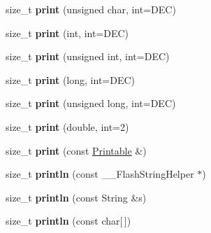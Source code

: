 \begin{DoxyCompactItemize}
\item 
\hypertarget{class_print_a97bd44df9222fa4a51a1266fab8d3bc1}{}size\+\_\+t {\bfseries print} (unsigned char, int=D\+E\+C)\label{class_print_a97bd44df9222fa4a51a1266fab8d3bc1}

\item 
\hypertarget{class_print_a32cb3cf32d701c797b2b2d1080052dfe}{}size\+\_\+t {\bfseries print} (int, int=D\+E\+C)\label{class_print_a32cb3cf32d701c797b2b2d1080052dfe}

\item 
\hypertarget{class_print_a87275de35583868a370f43ce1c887750}{}size\+\_\+t {\bfseries print} (unsigned int, int=D\+E\+C)\label{class_print_a87275de35583868a370f43ce1c887750}

\item 
\hypertarget{class_print_ab1fb2a2384c7b9f628943f5046e7d1c1}{}size\+\_\+t {\bfseries print} (long, int=D\+E\+C)\label{class_print_ab1fb2a2384c7b9f628943f5046e7d1c1}

\item 
\hypertarget{class_print_a26a40be7a557c0bc391a15dce9f06954}{}size\+\_\+t {\bfseries print} (unsigned long, int=D\+E\+C)\label{class_print_a26a40be7a557c0bc391a15dce9f06954}

\item 
\hypertarget{class_print_ae8b4c025786c820afe0a90aeea01c9c5}{}size\+\_\+t {\bfseries print} (double, int=2)\label{class_print_ae8b4c025786c820afe0a90aeea01c9c5}

\item 
\hypertarget{class_print_a901b0f06ae34aab31b8fbb4298f0596e}{}size\+\_\+t {\bfseries print} (const \hyperlink{class_printable}{Printable} \&)\label{class_print_a901b0f06ae34aab31b8fbb4298f0596e}

\item 
\hypertarget{class_print_a4fd286b325d3b1a786cfa35072a8ef52}{}size\+\_\+t {\bfseries println} (const \+\_\+\+\_\+\+Flash\+String\+Helper $\ast$)\label{class_print_a4fd286b325d3b1a786cfa35072a8ef52}

\item 
\hypertarget{class_print_afd6cc6e2c1163f94c60855ad233899bd}{}size\+\_\+t {\bfseries println} (const String \&s)\label{class_print_afd6cc6e2c1163f94c60855ad233899bd}

\item 
\hypertarget{class_print_ad337ce3f7977411b7d34d47a51e5737e}{}size\+\_\+t {\bfseries println} (const char\mbox{[}$\,$\mbox{]})\label{class_print_ad337ce3f7977411b7d34d47a51e5737e}


\end{DoxyCompactItemize}
